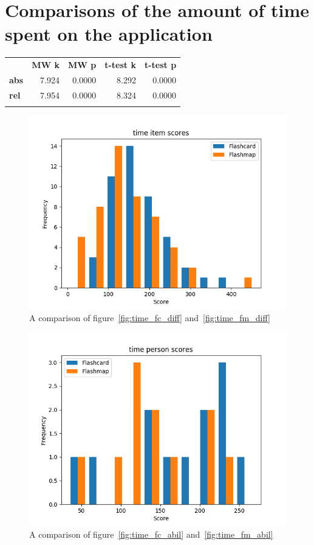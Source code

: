 \FloatBarrier
\section{Comparisons of the amount of time spent on the application}

\begin{longtable}[c]{@{}lrrrr@{}}
\toprule\addlinespace
& \textbf{MW k} & \textbf{MW p} &
\textbf{t-test k} & \textbf{t-test p}
\\\addlinespace
\midrule
\textbf{abs} & 7.924 & 0.0000 & 8.292 & 0.0000
\\\addlinespace
\textbf{rel} & 7.954 & 0.0000 & 8.324 & 0.0000
\\\addlinespace
\bottomrule
    \label{tab:time_comp}
\end{longtable}

\begin{figure}
    \includegraphics[width=\textwidth]{img/time_diff.png}
    \caption{A comparison of figure~\protect\ref{fig:time_fc_diff} and~\protect\ref{fig:time_fm_diff}}
    \label{fig:time_diff}
\end{figure}
\begin{figure}
    \includegraphics[width=\textwidth]{img/time_abil.png}
    \caption{A comparison of figure~\protect\ref{fig:time_fc_abil} and~\protect\ref{fig:time_fm_abil}}
    \label{fig:time_abil}
\end{figure}
